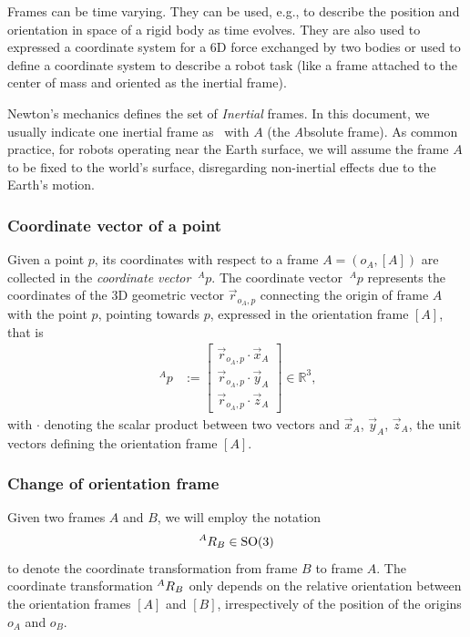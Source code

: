 Frames can be time varying. They can be used, e.g., to describe the position and orientation in space of a rigid body as time evolves.
They are also used to expressed a coordinate system for a 6D force exchanged by two bodies
or used to define a coordinate system
to describe a robot task (like a frame attached to the center of mass and oriented as the inertial frame). 

Newton's mechanics defines the set of \emph{Inertial} frames. In this document, we usually indicate one inertial frame as \ with $A$ (the \emph{A}bsolute frame). As common practice, for robots operating near the Earth surface, we will assume the frame $A$ to be fixed to the world's surface, disregarding non-inertial effects due to the Earth's motion.

\subsubsection{Coordinate vector of a point}
Given a point $p$, its coordinates with respect to a frame $A = (o_A, [A])$ are collected in the {\em coordinate vector} ${~\!\!}^A p$. The coordinate vector ${~\!\!}^A p$ represents the coordinates of the 3D geometric vector ${\overset{\rightarrow}{r}}_{o_A,p}$ connecting the origin of frame $A$ with the point $p$, pointing towards $p$, expressed in the orientation frame $[A]$,
that is
\begin{align}
  ~^A p 
& := 
  \begin{bmatrix}
  {\overset{\rightarrow}{r}}_{o_A,p} 
  \cdot 
  {\overset{\rightarrow}{x}}_A \\
  {\overset{\rightarrow}{r}}_{o_A,p} 
  \cdot 
  {\overset{\rightarrow}{y}}_A \\
  {\overset{\rightarrow}{r}}_{o_A,p} 
  \cdot 
  {\overset{\rightarrow}{z}}_A
  \end{bmatrix}
\in \mathbb{R}^3,
\end{align}
with $\cdot$ denoting the scalar product
between two vectors and
${\overset{\rightarrow}{x}}_A$,
${\overset{\rightarrow}{y}}_A$,
${\overset{\rightarrow}{z}}_A$,
the unit vectors defining
the orientation frame $[A]$.

\subsubsection{Change of orientation frame}
Given two frames $A$ and $B$, we will employ the notation
\begin{equation}
  \hspace{0em}^{A} R_{B} \in \textrm{SO}(3) 
\end{equation}
to denote the coordinate transformation from frame $B$ to frame $A$. 
The coordinate transformation $\hspace{0em}^A R_B$ only depends on the
relative orientation between the orientation frames $[A]$ and $[B]$,
irrespectively of the position of the origins $o_A$ and $o_B$. 

